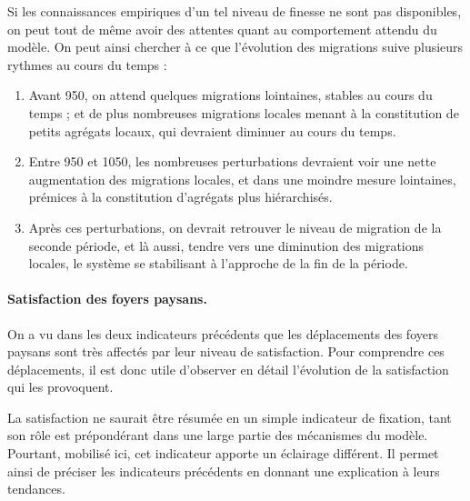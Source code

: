 Si les connaissances empiriques d'un tel niveau de finesse ne sont pas disponibles, on peut tout de même avoir des attentes quant au comportement attendu du modèle.
On peut ainsi chercher à ce que l'évolution des migrations suive plusieurs rythmes au cours du temps :
\begin{enumerate}
\item Avant 950, on attend quelques migrations lointaines, stables au cours du temps ; et de plus nombreuses migrations locales menant à la constitution de petits agrégats locaux, qui devraient diminuer au cours du temps.
\item Entre 950 et 1050, les nombreuses perturbations devraient voir une nette augmentation des migrations locales, et dans une moindre mesure lointaines, prémices à la constitution d'agrégats plus hiérarchisés.
\item Après ces perturbations, on devrait retrouver le niveau de migration de la seconde période, et là aussi, tendre vers une diminution des migrations locales, le système se stabilisant à l'approche de la fin de la période.
\end{enumerate}


\paragraph{Satisfaction des foyers paysans.}

On a vu dans les deux indicateurs précédents que les déplacements des foyers paysans sont très affectés par leur niveau de satisfaction.
Pour comprendre ces déplacements, il est donc utile d'observer en détail l'évolution de la satisfaction qui les provoquent.

La satisfaction ne saurait être résumée en un simple indicateur de fixation, tant son rôle est prépondérant dans une large partie des mécanismes du modèle.
Pourtant, mobilisé ici, cet indicateur apporte un éclairage différent.
Il permet ainsi de préciser les indicateurs précédents en donnant une explication à leurs tendances.

